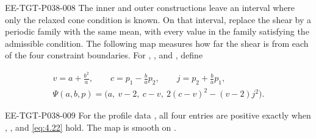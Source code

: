 \begin{EESegment}{EE-TGT-P038-008}
The inner and outer constructions leave an interval where only the relaxed cone condition is
known. On that interval, replace the shear by a periodic family with the same mean, with every
value in the family satisfying the admissible condition. The following map measures how far the
shear is from each of the four constraint boundaries. For ,
, and
, define
\end{EESegment}
\begin{equation}
\begin{gathered}
v=a+\frac{b^2}{a},\qquad c=p_1-\frac ba p_2,\qquad j=p_2+\frac ba p_1,\\
\Psi(a,b,p)=\bigl(a,\ v-2,\ c-v,\ 2(c-v)^2-(v-2)j^2\bigr).
\end{gathered}
\tag{4.35}\label{eq:4.35}
\end{equation}
\begin{EESegment}{EE-TGT-P038-009}
For the profile data , all four entries are positive exactly when
, , and \eqref{eq:4.22} hold. The map
 is smooth on .
\end{EESegment}

